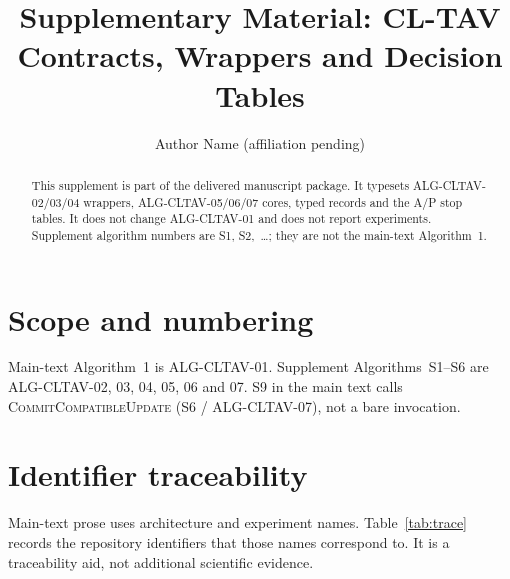 \documentclass[11pt,letterpaper]{article}
\title{Supplementary Material: CL-TAV Contracts, Wrappers and Decision Tables}
\author{Author Name (affiliation pending)}
\date{}
\begin{document}
\renewcommand{\thealgocf}{S\arabic{algocf}}
\maketitle

\begin{abstract}
\noindent This supplement is part of the delivered manuscript package. It
typesets ALG-CLTAV-02/03/04 wrappers, ALG-CLTAV-05/06/07 cores, typed records
and the A/P stop tables. It does not change ALG-CLTAV-01 and does not report
experiments. Supplement algorithm numbers are S1, S2,~\ldots; they are not
the main-text Algorithm~1.
\end{abstract}

\section{Scope and numbering}
Main-text Algorithm~1 is ALG-CLTAV-01. Supplement Algorithms~S1--S6 are
ALG-CLTAV-02, 03, 04, 05, 06 and 07. S9 in the main text calls
\textsc{CommitCompatibleUpdate} (S6 / ALG-CLTAV-07), not a bare
\IFhist{} invocation.

\section{Identifier traceability}
Main-text prose uses architecture and experiment names. Table~\ref{tab:trace}
records the repository identifiers that those names correspond to. It is a
traceability aid, not additional scientific evidence.
\end{document}
